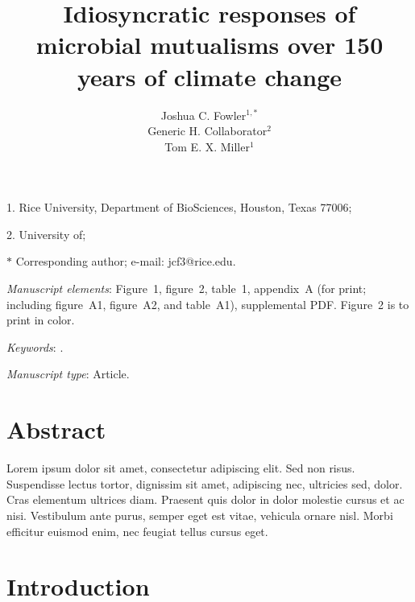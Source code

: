 \documentclass[11pt]{article}
\title{Idiosyncratic responses of microbial mutualisms over 150 years of climate change}
\author{Joshua C. Fowler$^{1,\ast}$ \\
	Generic H. Collaborator$^{2}$ \\
	Tom E. X. Miller$^{1}$}
\date{}
\begin{document}
	
	\maketitle
	
	\noindent{} 1. Rice University, Department of BioSciences, Houston, Texas 77006;

	\noindent{} 2. University of;

	\noindent{} $\ast$ Corresponding author; e-mail: jcf3@rice.edu.
	
	\bigskip
	
	\textit{Manuscript elements}: Figure~1, figure~2, table~1, appendix~A (for print; including figure~A1, figure~A2, and table~A1), supplemental PDF. Figure~2 is to print in color.
	
	\bigskip
	
	\textit{Keywords}: .
	
	\bigskip
	
	\textit{Manuscript type}: Article. %
	
	\bigskip
	
	
	
	\newpage{}
	
	\section*{Abstract}
	
	Lorem ipsum dolor sit amet, consectetur adipiscing elit. Sed non risus. Suspendisse lectus tortor, dignissim sit amet, adipiscing nec, ultricies sed, dolor. Cras elementum ultrices diam. Praesent quis dolor in dolor molestie cursus et ac nisi. Vestibulum ante purus, semper eget est vitae, vehicula ornare nisl. Morbi efficitur euismod enim, nec feugiat tellus cursus eget. 
	
	\newpage{}
	
	\section*{Introduction}
	
\end{document}
